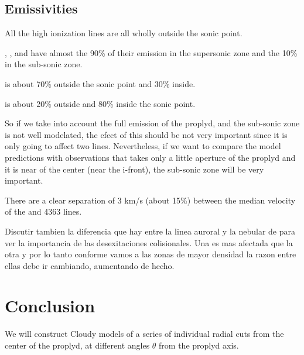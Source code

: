 \documentclass[aaspp]{article}
\begin{document}
\subsection{Emissivities}
\label{sec:emi}

All the high ionization lines are all wholly outside the sonic point.

\neii, \ha, \nii and \oii have almost the 90\% of their emission
in the supersonic zone and the 10\% in the sub-sonic zone.

\sii is about 70\% outside the sonic point and 30\% inside.

\oi is about 20\% outside and 80\% inside the sonic point.

So if we take into account the full emission of the proplyd, and the
sub-sonic zone is not well modelated, the efect of this should be not
very important since it is only going to affect two
lines. Nevertheless, if we want to compare the model predictions with
observations that takes only a little aperture of the proplyd and it
is near of the center (near the i-front), the sub-sonic zone will be
very important.

There are a clear separation of 3 km/s (about 15\%) between the median
velocity of the  and 4363 lines.

Discutir tambien la diferencia que hay entre la linea auroral y la
nebular de \nii para ver la importancia de las desexitaciones
colisionales. Una es mas afectada que la otra y por lo tanto conforme
vamos a las zonas de mayor densidad la razon entre ellas debe ir
cambiando, aumentando de hecho.

\section{Conclusion}
\label{sec:conclusions}

We will construct Cloudy models of a series of individual radial cuts from the center of the proplyd, at different angles $\theta$ from the proplyd axis.




\end{document}
